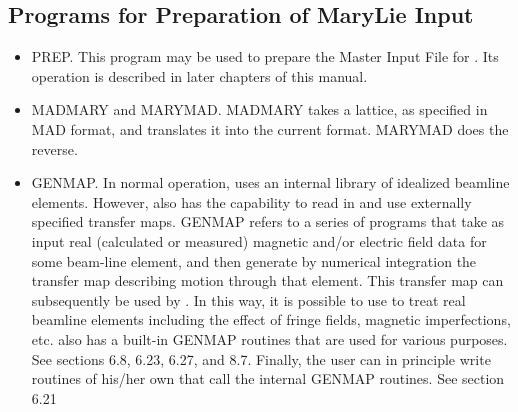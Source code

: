 \subsection{Programs for Preparation of MaryLie Input}
\begin{itemize}
\item  PREP\@.  This program may be used to prepare the Master Input File
         for \Maryend.  Its operation is described in later chapters of this
         manual.
\item   MADMARY and MARYMAD\@.  MADMARY takes a lattice, as specified in MAD
         format, and translates it into the current \Mary format.
         MARYMAD does the reverse.  
\item   GENMAP\@.  In normal operation, \Mary uses an internal library of
         idealized beamline elements.  However, \Mary also has the
         capability to read in and use externally specified transfer maps.
         GENMAP refers to a series of programs that take as input real
         (calculated or measured) magnetic and/or electric field data for
         some beam-line element, and then generate by numerical
         integration the transfer map describing motion through
         that element.  This transfer map can
         subsequently be used by \Maryend.  In this way, it is possible to
         use \Mary to treat real beamline elements including the effect
         of fringe fields, magnetic imperfections, etc.  \Mary also has a
		 built-in GENMAP routines that are used for various purposes.  See
		 sections 6.8, 6.23, 6.27, and 8.7.  Finally, the user can in principle
		 write routines of his/her own that call the internal GENMAP routines.
		 See section 6.21
\end{itemize}

